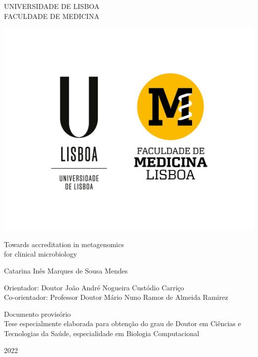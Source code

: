 \begin{titlepage}
    \begin{center}
        UNIVERSIDADE DE LISBOA\\
        FACULDADE DE MEDICINA
        
        {\includegraphics{figures/cover/UL+FMUL-VerticalPositivo.png}}
        
        \vspace{0.5cm}
        
        \Huge
        {Towards accreditation in metagenomics \\[1ex] for clinical microbiology}
        \normalsize
        
        \vspace{0.5cm}
        
        Catarina Inês Marques de Sousa Mendes
        
        \vspace{0.5cm}
        
        Orientador: Doutor João André Nogueira Custódio Carriço\\
        Co-orientador: Professor Doutor Mário Nuno Ramos de Almeida Ramirez
        
        \vspace{0.8cm}
        
        Documento provisório\\
        Tese especialmente elaborada para obtenção do grau de Doutor em Ciências e Tecnologias da Saúde, especialidade em Biologia Computacional\\
        
        \vspace{0.5cm}
        
        2022
        
    \end{center}
\end{titlepage}